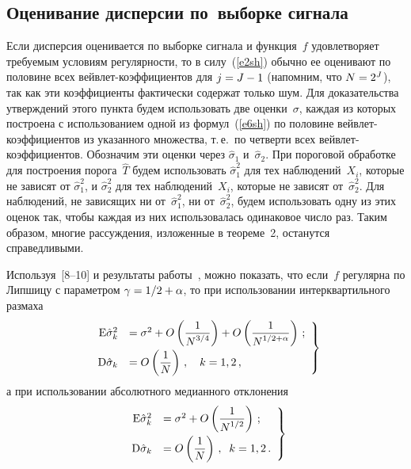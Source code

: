 \begin{multicols}{2}
\section{Оценивание дисперсии по~выборке сигнала}

Если дисперсия оценивается по выборке сигнала и функция~$f$ удовлетворяет 
требуемым условиям регулярности, то в силу~(\ref{e2sh}) 
обычно ее оценивают по половине всех вейвлет-коэффициентов для $j\hm=J-1$ (напомним, что 
$N\hm=2^J$), так как эти коэффициенты фактически содержат только шум. 
Для доказательства утверждений этого пункта будем использовать две оценки~$\sigma$, 
каждая из которых построена с использованием одной из формул~(\ref{e6sh}) 
по половине вейвлет-коэффициентов из указанного множества, т.\,е.\ 
по четверти всех вейвлет-ко\-эф\-фи\-ци\-ен\-тов. Обозначим эти оценки через 
$\hat{\sigma}_1$ и~$\hat{\sigma}_2$.
При пороговой обработке для построения порога~$\hat{T}$ будем
использовать $\hat{\sigma}_1^2$ для тех наблюдений~$X_i$, которые не
зависят от $\hat{\sigma}_1^2$, и $\hat{\sigma}_2^2$ для тех
наблюдений~$X_i$, которые не зависят от~$\hat{\sigma}_2^2$. Для
наблюдений, не зависящих ни от~$\hat{\sigma}_1^2$, ни от~$\hat{\sigma}_2^2$, 
будем использовать одну из этих оценок так,
чтобы каж\-дая из них использовалась одинаковое число раз. Таким
образом, многие рассуждения, изложенные в теореме~2, останутся
справедливыми.

Используя~[8--10] и результаты работы~\cite{7sh}, 
можно показать, что если~$f$ регулярна по Липшицу с параметром 
$\gamma\hm={1}/{2}\hm+\alpha$, то при использовании интерквартильного размаха
\begin{equation}
\left.
\begin{array}{rl}
\mbox{E}\hat{\sigma}_k^2&=\sigma^2+O\left(\displaystyle\frac{\displaystyle 1\mathstrut}{\displaystyle N^{{3}/{4}}\mathstrut}\right)+
O\left(\displaystyle\frac{\displaystyle 1\mathstrut}{\displaystyle N^{{1}/{2}+\alpha}\mathstrut}\right)\,;\\[9pt] 
\mbox{D}\hat{\sigma}_k&=O\left(\displaystyle\frac{\displaystyle 1\mathstrut}{\displaystyle N\mathstrut}\right)\,,\quad
k=1,2\,,
\end{array}
\right\}
\label{e25sh}
\end{equation}
а при использовании абсолютного медианного отклонения
\begin{equation}
\left.
\begin{array}{rl}
\mbox{E}\hat{\sigma}_k^2&=\sigma^2+O\left(
\displaystyle\frac{\displaystyle 1\mathstrut}{\displaystyle N^{{1}/{2}}\mathstrut}\right)\,;\\[9pt]
\mbox{D}\hat{\sigma}_k&=O\left(\displaystyle\frac{\displaystyle 1\mathstrut}{\displaystyle N\mathstrut}\right)\,,\;\;k=1,2\,.
\end{array}
\right\}
\label{e26sh}
\end{equation}


\end{multicols}
